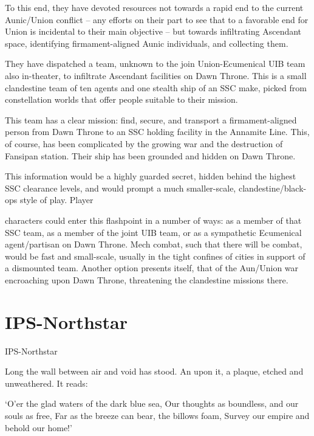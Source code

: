 To this end, they have devoted resources not towards a rapid end to the current Aunic/Union  
conflict -- any efforts on their part to see that to a favorable end for Union is incidental to their  
main objective -- but towards infiltrating Ascendant space, identifying firmament-aligned Aunic  
individuals, and collecting them. 
 

They have dispatched a team, unknown to the join Union-Ecumenical UIB team also in-theater,  
to infiltrate Ascendant facilities on Dawn Throne. This is a small clandestine team of ten agents  
and one stealth ship of an SSC make, picked from constellation worlds that offer people suitable  
to their mission. 
 

This team has a clear mission: find, secure, and transport a firmament-aligned person from Dawn  
Throne to an SSC holding facility in the Annamite Line. This, of course, has been complicated by  
the growing war and the destruction of Fansipan station. Their ship has been grounded and  
hidden on Dawn Throne. 
 

This information would be a highly guarded secret, hidden behind the highest SSC clearance  
levels, and would prompt a much smaller-scale, clandestine/black-ops style of play. Player  

                                                                                                           


characters could enter this flashpoint in a number of ways: as a member of that SSC team, as a  
member of the joint UIB team, or as a sympathetic Ecumenical agent/partisan on Dawn Throne.  
Mech combat, such that there will be combat, would be fast and small-scale, usually in the tight  
confines of cities in support of a dismounted team.  Another option presents itself, that of the  
Aun/Union war encroaching upon Dawn Throne, threatening the clandestine missions there. 
 

                                                                                                           
\section{IPS-Northstar}

IPS-Northstar  

                 Long the wall between air and void has stood. An upon it, a plaque, etched  
                 and unweathered. It reads:   

                         ‘O’er the glad waters of the dark blue sea,  
                         Our thoughts as boundless, and our souls as free,   
                         Far as the breeze can bear, the billows foam,   
                         Survey our empire and behold our home!’  

